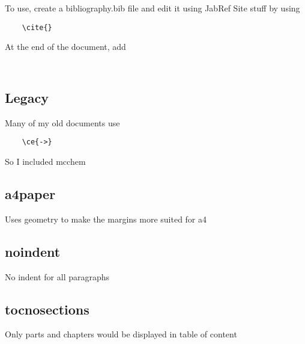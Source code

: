 \documentclass{article}
\begin{document}
To use, create a bibliography.bib file and edit it using JabRef
Site stuff by using 
\begin{verbatim}
	\cite{}
\end{verbatim}
At the end of the document, add 
\begin{verbatim}
	
\end{verbatim}

\subsection{Legacy}

Many of my old documents use 

\begin{verbatim}
	\ce{->}
\end{verbatim}

So I included mcchem

\subsection{a4paper}

Uses geometry to make the margins more suited for a4

\subsection{noindent}

No indent for all paragraphs

\subsection{tocnosections}

Only parts and chapters would be displayed in table of content
\end{document}
